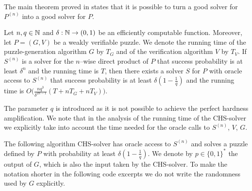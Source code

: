 The main theorem proved in \cite{canetti2005hardness} states that it is possible to turn a good solver for $P^{(n)}$
into a good solver for $P$.
%
\begin{theorem}
  \label{thm:wvp_chs}
Let $n,q \in \mathbb{N}$ and $\delta: \mathbb{N} \rightarrow (0,1)$ be an efficiently computable function.
Moreover, let $P = (G,V)$ be a weakly verifiable puzzle. We denote the running time of the
puzzle-generation algorithm $G$ by $T_G$ and of the verification algorithm $V$ by $T_V$.
If $S^{(n)}$ is a solver for the $n$--wise direct product of $P$ that success probability is at least $\delta^{n}$
and the running time is $T$, then there exists a solver $S$ for $P$ with oracle access to $S^{(n)}$ that success
probability is at least $\delta(1-\frac{1}{q})$ and the running time is $O\Big(\frac{nq^3}{\delta^{2n-1}}(T + nT_G + nT_V)\Big)$.
\end{theorem}
%
The parameter $q$ is introduced as it is not possible to achieve
the perfect hardness amplification. We note that in the analysis of
the running time of the CHS-solver we explicitly take into account the time needed for the oracle calls to $S^{(n)}$, $V$, $G$.

The following algorithm CHS-solver has oracle access to $S^{(n)}$ and
solves a puzzle defined by $P$ with probability at least $\delta(1  - \frac{1}{q})$.
We denote by $p \in \{0,1\}^{*}$ the output of $G$, which is also the input taken by the CHS-solver.
To make the notation shorter in the following code excerpts we do not write the randomness used by $G$ explicitly.

